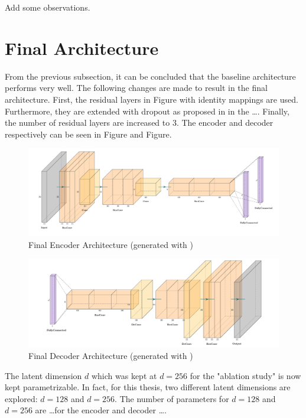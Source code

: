 Add some observations.

\section{Final Architecture}
From the previous subsection, it can be concluded that the baseline architecture performs very well.
The following changes are made to result in the final architecture.
First, the residual layers in Figure  with identity mappings are used.
Furthermore, they are extended with dropout as proposed in \parencite{WideResNet} in the \dots.
Finally, the number of residual layers are increased to $3$.
The encoder and decoder respectively can be seen in Figure and Figure.
\begin{figure}[h!]
    \centering
    \includegraphics[width=\textwidth]{figures/model_architecture/build/final_vae_encoder.pdf}
    \caption{Final Encoder Architecture (generated with \parencite{NNVisualization})}
\end{figure}
\begin{figure}[h!]
    \centering
    \includegraphics[width=\textwidth]{figures/model_architecture/build/final_vae_decoder.pdf}
    \caption{Final Decoder Architecture (generated with \parencite{NNVisualization})}
\end{figure}
The latent dimension $d$ which was kept at $d = 256$ for the "ablation study" is now kept parametrizable.
In fact, for this thesis, two different latent dimensions are explored: $d = 128$ and $d = 256$.
The number of parameters for $d = 128$ and $d = 256$ are \dots for the encoder and decoder \dots.

